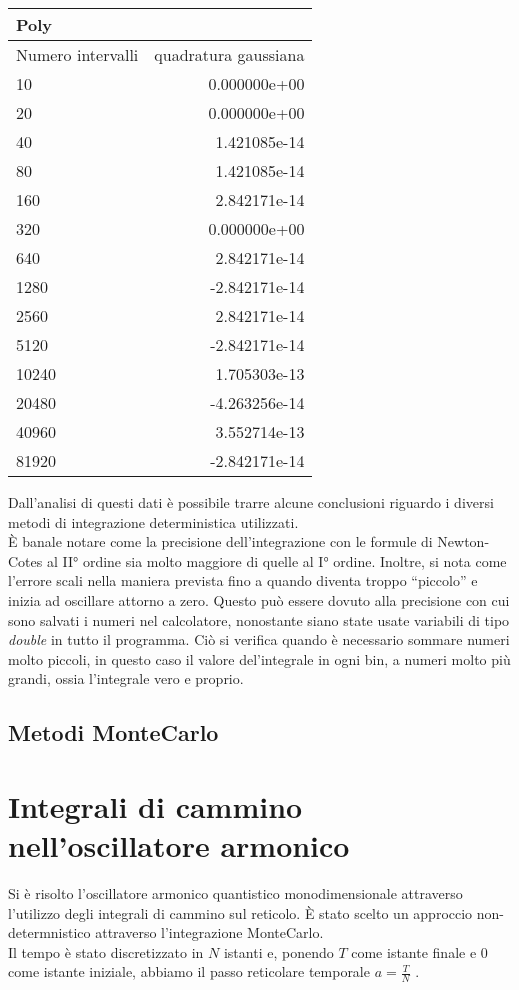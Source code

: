 \begin{center}
\begin{longtable}[h]{lr}
\toprule
Poly & \\
\midrule
Numero intervalli & quadratura gaussiana  \\
10	&0.000000e+00 \\
20&	0.000000e+00 \\ 
40&	1.421085e-14 \\
80&	1.421085e-14 \\
160&	2.842171e-14 \\
320&	0.000000e+00 \\
640&	2.842171e-14 \\
1280&	-2.842171e-14 \\ 
2560&	2.842171e-14 \\
5120&	-2.842171e-14 \\ 
10240&	1.705303e-13 \\
20480&	-4.263256e-14 \\
40960&	3.552714e-13 \\ 
81920&	-2.842171e-14 \\
\midrule

\bottomrule
\end{longtable}
 
\end{center}
Dall'analisi di questi dati è possibile trarre alcune conclusioni riguardo i diversi metodi di integrazione deterministica utilizzati.\\
È banale notare come la precisione dell'integrazione con le formule di Newton-Cotes al II° ordine sia molto maggiore di quelle al I° ordine.
Inoltre, si nota come l'errore scali nella maniera prevista fino a quando diventa troppo ``piccolo'' e inizia ad oscillare attorno a zero.
Questo può essere dovuto alla precisione con cui sono salvati i numeri nel calcolatore, nonostante siano state usate variabili di tipo \emph{double} in tutto il programma.
Ciò si verifica quando è necessario sommare numeri molto piccoli, in questo caso il valore del'integrale in ogni bin, a numeri molto più grandi,
ossia l'integrale vero e proprio.

\section{Metodi MonteCarlo}
\label{sec:montecarlo}






\chapter{Integrali di cammino nell'oscillatore armonico}
Si è risolto l'oscillatore armonico quantistico monodimensionale attraverso l'utilizzo degli integrali di cammino sul reticolo.
È stato scelto un approccio non-determnistico attraverso l'integrazione MonteCarlo.\\
Il tempo è stato discretizzato in $N$ istanti e, ponendo $T$ come istante finale e $0$ come istante iniziale,
abbiamo il passo reticolare temporale $ a = \frac{T}{N}$ .
